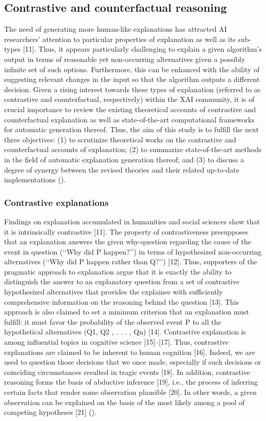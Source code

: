 \documentclass[binding=0.6cm]{sapthesis}
\newcommand{\mycite}[1]{(\cite{#1})}
\begin{document}
\subsection{Contrastive and counterfactual reasoning}
\label{sec:bg.xai.cf-reason}
The need of generating more human-like explanations has attracted AI researchers’ attention to particular properties of explanation as well as its sub-types [11]. Thus, it appears particularly challenging to explain a given algorithm’s output in terms of reasonable yet non-occurring alternatives given a possibly infinite set of such options. Furthermore, this can be enhanced with the ability of suggesting relevant changes in the input so that the algorithm outputs a different decision. Given a rising interest towards these types of explanation (referred to as contrastive and counterfactual, respectively) within the XAI community, it is of crucial importance to review the existing theoretical accounts of contrastive and counterfactual explanation as well as state-of-the-art computational frameworks for automatic generation thereof. Thus, the aim of this study is to fulfill the next three objectives: (1) to scrutinize theoretical works on the contrastive and counterfactual accounts of explanation; (2) to summarize state-of-the-art methods in the field of automatic explanation generation thereof; and (3) to discuss a degree of synergy between the revised theories and their related up-to-date implementations \mycite{stepin2021-xai-cf-contrative-survey}.

\subsubsection{Contrastive explanations}
\label{sec:bg.xai.contrastive}
Findings on explanation accumulated in humanities and social sciences show that it is intrinsically contrastive [11]. The property of contrastiveness presupposes that an explanation answers the given why-question regarding the cause of the event in question (‘‘Why did P happen?’’) in terms of hypothesized non-occurring alternatives (‘‘Why did P happen rather than Q?’’) [12]. Thus, supporters of the pragmatic approach to explanation argue that it is exactly the ability to distinguish the answer to an explanatory question from a set of contrastive hypothesized alternatives that provides the explainee with sufficiently comprehensive information on the reasoning behind the question [13]. This approach is also claimed to set a minimum criterion that an explanation must fulfill: it must favor the probability of the observed event P to all the hypothetical alternatives (Q1, Q2 , . . . , Qn) [14]. Contrastive explanation is among influential topics in cognitive science [15]–[17]. Thus, contrastive explanations are claimed to be inherent to human cognition [16]. Indeed, we are used to question those decisions that we once made, especially if such decisions or coinciding circumstances resulted in tragic events [18]. In addition, contrastive reasoning forms the basis of abductive inference [19], i.e., the process of inferring certain facts that render some observation plausible [20]. In other words, a given observation can be explained on the basis of the most likely among a pool of competing hypotheses [21] \mycite{stepin2021-xai-cf-contrative-survey}.
\end{document}

